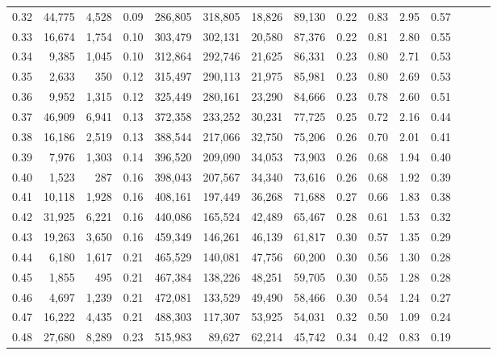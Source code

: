 \begin{tabular}{rrrrrrrrrrrrrrr}
0.32 &  44,775 &  4,528 &  0.09 &  286,805 &  318,805 &   18,826 &   89,130 &  0.22 &  0.83 &  2.95 &      0.57 \\
0.33 &  16,674 &  1,754 &  0.10 &  303,479 &  302,131 &   20,580 &   87,376 &  0.22 &  0.81 &  2.80 &      0.55 \\
0.34 &   9,385 &  1,045 &  0.10 &  312,864 &  292,746 &   21,625 &   86,331 &  0.23 &  0.80 &  2.71 &      0.53 \\
0.35 &   2,633 &    350 &  0.12 &  315,497 &  290,113 &   21,975 &   85,981 &  0.23 &  0.80 &  2.69 &      0.53 \\
0.36 &   9,952 &  1,315 &  0.12 &  325,449 &  280,161 &   23,290 &   84,666 &  0.23 &  0.78 &  2.60 &      0.51 \\
0.37 &  46,909 &  6,941 &  0.13 &  372,358 &  233,252 &   30,231 &   77,725 &  0.25 &  0.72 &  2.16 &      0.44 \\
0.38 &  16,186 &  2,519 &  0.13 &  388,544 &  217,066 &   32,750 &   75,206 &  0.26 &  0.70 &  2.01 &      0.41 \\
0.39 &   7,976 &  1,303 &  0.14 &  396,520 &  209,090 &   34,053 &   73,903 &  0.26 &  0.68 &  1.94 &      0.40 \\
0.40 &   1,523 &    287 &  0.16 &  398,043 &  207,567 &   34,340 &   73,616 &  0.26 &  0.68 &  1.92 &      0.39 \\
0.41 &  10,118 &  1,928 &  0.16 &  408,161 &  197,449 &   36,268 &   71,688 &  0.27 &  0.66 &  1.83 &      0.38 \\
0.42 &  31,925 &  6,221 &  0.16 &  440,086 &  165,524 &   42,489 &   65,467 &  0.28 &  0.61 &  1.53 &      0.32 \\
0.43 &  19,263 &  3,650 &  0.16 &  459,349 &  146,261 &   46,139 &   61,817 &  0.30 &  0.57 &  1.35 &      0.29 \\
0.44 &   6,180 &  1,617 &  0.21 &  465,529 &  140,081 &   47,756 &   60,200 &  0.30 &  0.56 &  1.30 &      0.28 \\
0.45 &   1,855 &    495 &  0.21 &  467,384 &  138,226 &   48,251 &   59,705 &  0.30 &  0.55 &  1.28 &      0.28 \\
0.46 &   4,697 &  1,239 &  0.21 &  472,081 &  133,529 &   49,490 &   58,466 &  0.30 &  0.54 &  1.24 &      0.27 \\
0.47 &  16,222 &  4,435 &  0.21 &  488,303 &  117,307 &   53,925 &   54,031 &  0.32 &  0.50 &  1.09 &      0.24 \\
0.48 &  27,680 &  8,289 &  0.23 &  515,983 &   89,627 &   62,214 &   45,742 &  0.34 &  0.42 &  0.83 &      0.19 \\

\end{tabular}
